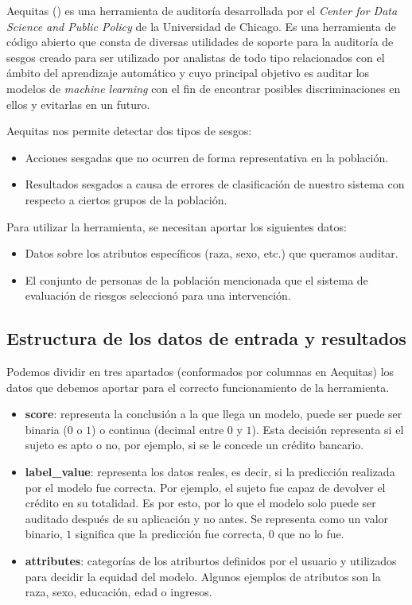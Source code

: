 Aequitas (\cite{aequitas2019}) es una herramienta de auditoría desarrollada por el \textit{Center for Data Science and Public Policy} de la
Universidad de Chicago. Es una herramienta de código abierto que consta de diversas utilidades de soporte para la auditoría de sesgos creado para ser utilizado por analistas de todo tipo relacionados con el ámbito del aprendizaje automático y cuyo principal objetivo es auditar los modelos de \textit{machine learning} con el fin de encontrar posibles discriminaciones en ellos y evitarlas en un futuro.

Aequitas nos permite detectar dos tipos de sesgos:

\begin{itemize}
    \item Acciones sesgadas que no ocurren de forma representativa en la población.
    \item Resultados sesgados a causa de errores de clasificación de nuestro sistema con respecto a ciertos grupos de la población.
\end{itemize}

Para utilizar la herramienta, se necesitan aportar los siguientes datos:

\begin{itemize}
    \item Datos sobre los atributos específicos (raza, sexo, etc.) que queramos auditar.
    \item El conjunto de personas de la población mencionada que el sistema de evaluación de riesgos seleccionó para una intervención.
\end{itemize}

\subsection*{Estructura de los datos de entrada y resultados}

Podemos dividir en tres apartados (conformados por columnas en Aequitas) los datos que debemos aportar para el correcto funcionamiento de la herramienta.

\begin{itemize}
    \item \textbf{score}: representa la conclusión a la que llega un modelo, puede ser puede ser binaria ($0$ o $1$) o continua (decimal entre $0$ y $1$). Esta decisión representa si el sujeto es apto o no, por ejemplo, si se le concede un crédito bancario.
    \item \textbf{label\_value}: representa los datos reales, es decir, si la predicción realizada por el modelo fue correcta. Por ejemplo, el sujeto fue capaz de devolver el crédito en su totalidad. Es por esto, por lo que el modelo solo puede ser auditado después de su aplicación y no antes. Se representa como un valor binario, $1$ significa que la predicción fue correcta, $0$ que no lo fue.
    \item \textbf{attributes}: categorías de los atriburtos definidos por el usuario y utilizados para decidir la equidad del modelo. Algunos ejemplos de atributos son la raza, sexo, educación, edad o ingresos.
\end{itemize}

